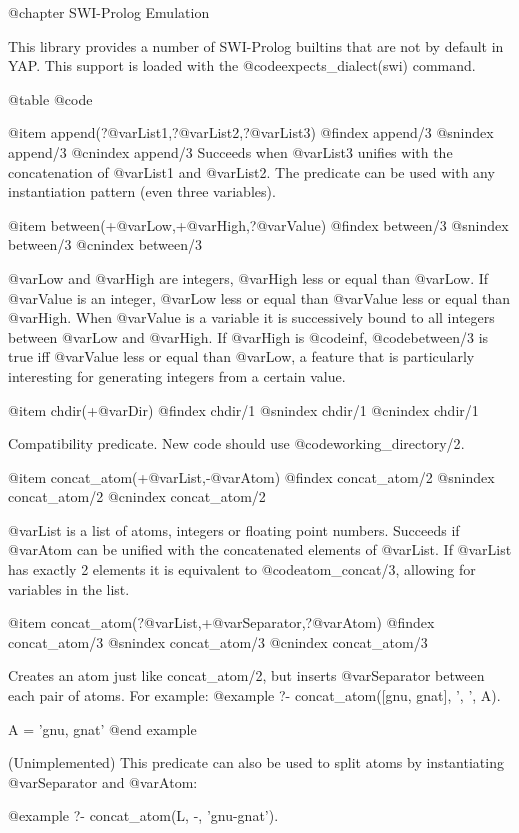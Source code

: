 @chapter SWI-Prolog Emulation

This library provides a number of SWI-Prolog builtins that are not by
default in YAP. This support is loaded with the
@code{expects_dialect(swi)} command.

@table @code

@item append(?@var{List1},?@var{List2},?@var{List3})
@findex append/3
@snindex append/3
@cnindex append/3
Succeeds when @var{List3} unifies with the concatenation of @var{List1}
and @var{List2}. The predicate can be used with any instantiation
pattern (even three variables).

@item between(+@var{Low},+@var{High},?@var{Value})
@findex between/3
@snindex between/3
@cnindex between/3

@var{Low} and @var{High} are integers, @var{High} less or equal than
@var{Low}. If @var{Value} is an integer, @var{Low} less or equal than
@var{Value} less or equal than @var{High}.  When @var{Value} is a
variable it is successively bound to all integers between @var{Low} and
@var{High}.  If @var{High} is @code{inf}, @code{between/3} is true iff
@var{Value} less or equal than @var{Low}, a feature that is particularly
interesting for generating integers from a certain value.

@item chdir(+@var{Dir})
@findex chdir/1
@snindex chdir/1
@cnindex chdir/1

Compatibility predicate.  New code should use @code{working_directory/2}.

@item concat_atom(+@var{List},-@var{Atom})
@findex concat_atom/2
@snindex concat_atom/2
@cnindex concat_atom/2

@var{List} is a list of atoms, integers or floating point numbers. Succeeds
if @var{Atom} can be unified with the concatenated elements of @var{List}. If
@var{List} has exactly 2 elements it is equivalent to @code{atom_concat/3},
allowing for variables in the list.

@item concat_atom(?@var{List},+@var{Separator},?@var{Atom})
@findex concat_atom/3
@snindex concat_atom/3
@cnindex concat_atom/3

Creates an atom just like concat_atom/2, but inserts @var{Separator}
between each pair of atoms.  For example:
@example
?- concat_atom([gnu, gnat], ', ', A).

A = 'gnu, gnat'
@end example

(Unimplemented) This predicate can also be used to split atoms by
instantiating @var{Separator} and @var{Atom}:

@example
?- concat_atom(L, -, 'gnu-gnat').

